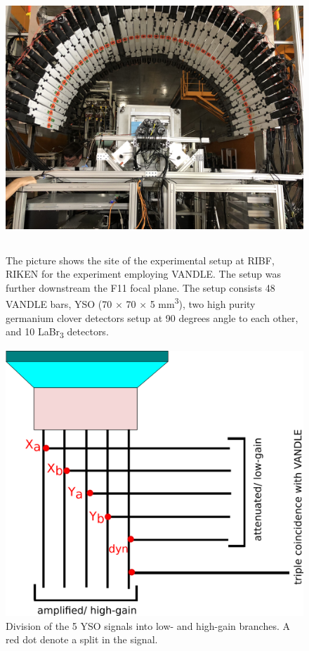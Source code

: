 \begin{figure}[h]
    \centering
    \includegraphics[width=12cm,height=10cm]{figures/vandle_ribf.jpg}
    \caption[The picture shows the site of the experimental setup]{The picture shows the site of the experimental setup at RIBF, RIKEN for the experiment employing VANDLE. The setup was further downstream the F11 focal plane. The setup consists 48 VANDLE bars, YSO (70 $\times$ 70 $\times$ 5  mm\textsuperscript{3}), two high purity germanium clover detectors setup at 90 degrees angle to each other, and 10 LaBr\textsubscript{3} detectors.}
    \label{fig:vandleribf}
\end{figure}


\begin{figure}[h]
	\centering
	\includegraphics[width=14cm, height=10cm]{figures/YSO_trigger_scheme.png}
	\caption[Division of the 5 YSO signals into low- and high-gain branches]{Division of the 5 YSO signals into low- and high-gain branches. A red dot denote a split in the signal.}
	\label{fig:ysotriggervandle}
\end{figure}

